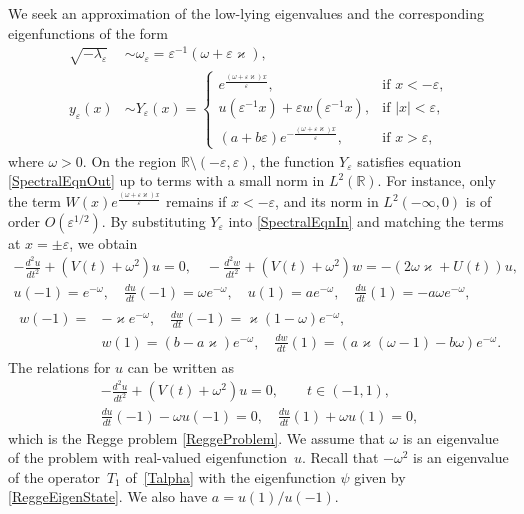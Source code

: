 \documentclass[reqno]{amsart}
\theoremstyle{definition}
\theoremstyle{remark}
\numberwithin{equation}{section}
\renewcommand{\kappa}{\varkappa}
\newcommand{\Real}{\mathbb R}
\newcommand{\eps}{\varepsilon}
\begin{document}
We seek an approximation of the low-lying eigenvalues and the corresponding eigenfunctions of the form
\begin{align}\label{ApprOmega}
\sqrt{-\lambda_\eps}&\sim \omega_\eps=\eps^{-1}(\omega+\eps\kappa),
\\\label{ApprY}
y_\eps(x)&\sim Y_\eps(x)=
  \begin{cases}
    e^{\frac{(\omega+\eps\kappa)x}{\eps}}, &\text{if } x<-\eps,
    \\
    u(\eps^{-1}x)+\eps w (\eps^{-1}x),& \text{if } |x|<\eps,
    \\
    (a+b\eps)e^{-\frac{(\omega+\eps\kappa)x}{\eps}}, &\text{if } x>\eps,
  \end{cases}
\end{align}
where $\omega>0$. On the region $\Real\setminus (-\eps,\eps)$, the function $Y_\eps$ satisfies equation \eqref{SpectralEqnOut} up to terms with a small norm in $L^2(\Real)$. For instance,  only the term $W(x) e^{\frac{(\omega+\eps\kappa)x}{\eps}}$ remains if $x<-\eps$, and its norm in $L^2(-\infty,0)$ is of order $O(\eps^{1/2})$. By substituting $Y_\eps$ into  \eqref{SpectralEqnIn} and matching the terms at $x=\pm \eps$, we obtain
\begin{equation}\label{YintoEqnConds}
\begin{gathered}
  -\frac{d^2 u}{dt^2}+(V(t)+\omega^2)u=0, \quad -\frac{d^2 w }{dt^2}+(V(t)+\omega^2)w =-(2\omega\kappa+U(t))u,
  \\
  u(-1)=e^{-\omega}, \quad \frac{d u}{dt}(-1)=\omega e^{-\omega}, \quad  u(1)=ae^{-\omega}, \quad \frac{d u}{dt}(1)=-a\omega e^{-\omega},
  \\
  \begin{aligned}
     w (-1)=&-\kappa e^{-\omega}, \quad\frac{d w }{dt}(-1)=\kappa(1-\omega) e^{-\omega}, \\
  &w (1)=(b -a\kappa)e^{-\omega}, \quad \frac{d w }{dt}(1)=(a\kappa(\omega-1)-b\omega) e^{-\omega}.
  \end{aligned}
\end{gathered}
\end{equation}
The relations for $u$ can be written as
\begin{gather}\label{ReggeEqn}
   -\frac{d^2 u}{dt^2}+(V(t)+\omega^2)u=0, \qquad t\in(-1,1),
  \\ \label{ReggeConds}
  \frac{d u}{dt}(-1)-\omega u(-1)=0,\quad \frac{d u}{dt}(1)+\omega u(1)=0,
\end{gather}
which is the Regge problem \eqref{ReggeProblem}. We assume that $\omega$ is an eigenvalue of the problem  with real-valued eigenfunction~$u$. Recall that  $-\omega^2$ is an eigenvalue of the operator~$T_1$ of~\eqref{Talpha} with the eigenfunction $\psi$ given by \eqref{ReggeEigenState}.
We also have $a=u(1)/u(-1)$.
\end{document}
